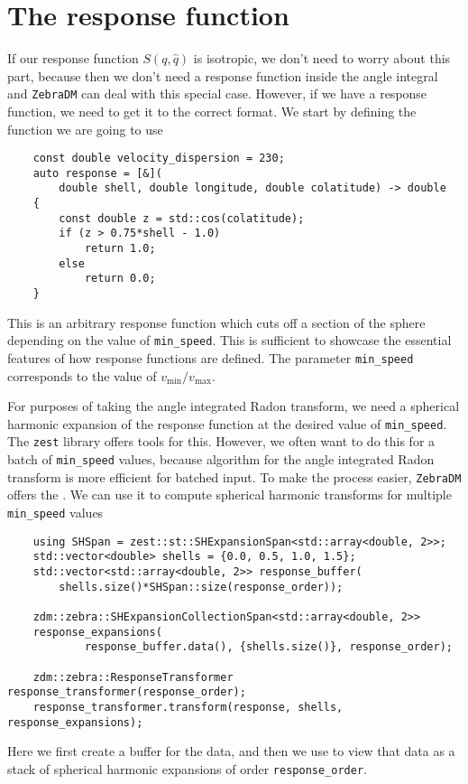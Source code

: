 \documentclass{article}
\newcommand{\unitv}[1]{\hat{#1}}
\begin{document}
\section{The response function}

If our response function $S(q, \unitv{q})$ is isotropic, we don't need to worry about this part, because then we don't need a response function inside the angle integral and \texttt{ZebraDM} can deal with this special case. However, if we have a response function, we need to get it to the correct format. We start by defining the function we are going to use
\begin{verbatim}
    const double velocity_dispersion = 230;
    auto response = [&](
        double shell, double longitude, double colatitude) -> double
    {
        const double z = std::cos(colatitude);
        if (z > 0.75*shell - 1.0)
            return 1.0;
        else
            return 0.0;
    }
\end{verbatim}
This is an arbitrary response function which cuts off a section of the sphere depending on the value of \texttt{min\_speed}. This is sufficient to showcase the essential features of how response functions are defined. The parameter \texttt{min\_speed} corresponds to the value of $v_\text{min}/v_\text{max}$.

For purposes of taking the angle integrated Radon transform, we need a spherical harmonic expansion of the response function at the desired value of \texttt{min\_speed}. The \texttt{zest} library offers tools for this. However, we often want to do this for a batch of \texttt{min\_speed} values, because algorithm for the angle integrated Radon transform is more efficient for batched input. To make the process easier, \texttt{ZebraDM} offers the . We can use it to compute spherical harmonic transforms for multiple \texttt{min\_speed} values
\begin{verbatim}
    using SHSpan = zest::st::SHExpansionSpan<std::array<double, 2>>;
    std::vector<double> shells = {0.0, 0.5, 1.0, 1.5};
    std::vector<std::array<double, 2>> response_buffer(
        shells.size()*SHSpan::size(response_order));

    zdm::zebra::SHExpansionCollectionSpan<std::array<double, 2>>
    response_expansions(
            response_buffer.data(), {shells.size()}, response_order);

    zdm::zebra::ResponseTransformer response_transformer(response_order);
    response_transformer.transform(response, shells, response_expansions);
\end{verbatim}
Here we first create a buffer for the data, and then we use  to view that data as a stack of spherical harmonic expansions of order \texttt{response\_order}.
\end{document}
